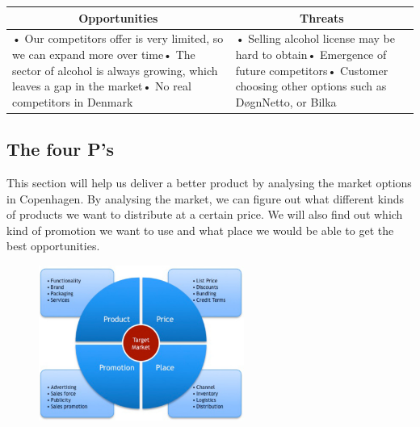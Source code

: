 \documentclass[12p]{article}
\begin{document}
\begin{table}[htbp]
  \centering
    \begin{tabular}{|p{}|p{}|}
    \hline
    \multicolumn{1}{|c|}{\textbf{Opportunities}} & \multicolumn{1}{c|}{\textbf{Threats}} \\
    \hline
    {• Our competitors offer is very limited, so we can expand more over time\newline{}• The sector of alcohol is always growing, which leaves a gap in the market\newline{}• No real competitors in Denmark} & • Selling alcohol license may be hard to obtain\newline{}• Emergence of future competitors\newline{}• Customer choosing other options such as DøgnNetto, or Bilka \\
    \hline
    \end{tabular}
  \label{tab:swot_two}
\end{table}


\newpage


\subsection{The four P's}

This section will help us deliver a better product by analysing the market options in Copenhagen. By analysing the market, we can figure out what different kinds of products we want to distribute at a certain price. We will also find out which kind of promotion we want to use and what place we would be able to get the best opportunities. 

\begin{figure}[h]
    \center
    \includegraphics[width=0.6\textwidth]{4p}\\
\end{figure}
\end{document}
